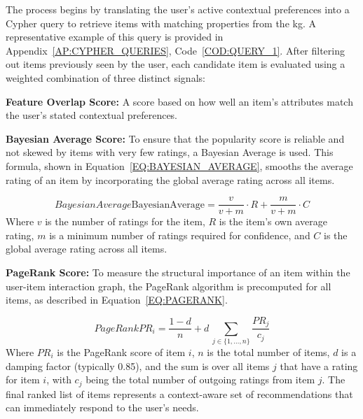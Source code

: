 The process begins by translating the user's active contextual preferences into a Cypher query to retrieve items with matching properties from the \ac{kg}. A representative example of this query is provided in Appendix~\ref{AP:CYPHER_QUERIES}, Code~\ref{COD:QUERY_1}. After filtering out items previously seen by the user, each candidate item is evaluated using a weighted combination of three distinct signals:
\begin{compactitem}[\textbullet]
    \item \textbf{Feature Overlap Score:} A score based on how well an item's attributes match the user's stated contextual preferences.
    \item \textbf{Bayesian Average Score:} To ensure that the popularity score is reliable and not skewed by items with very few ratings, a Bayesian Average is used. This formula, shown in Equation~\ref{EQ:BAYESIAN_AVERAGE}, smooths the average rating of an item by incorporating the global average rating across all items.
    
    \vspace{5pt}
    \begin{equation}[EQ:BAYESIAN_AVERAGE]{Bayesian Average}
        \text{BayesianAverage} = \frac{v}{v+m} \cdot R + \frac{m}{v+m} \cdot C
    \end{equation}
    Where $v$ is the number of ratings for the item, $R$ is the item's own average rating, $m$ is a minimum number of ratings required for confidence, and $C$ is the global average rating across all items.

    \item \textbf{PageRank Score:} To measure the structural importance of an item within the user-item interaction graph, the PageRank algorithm \cite{PAGERANK} is precomputed for all items, as described in Equation~\ref{EQ:PAGERANK}.

    \vspace{5pt}
    \begin{equation}[EQ:PAGERANK]{PageRank}
        PR_{i}={\frac  {1-d}{n}}+d\,\sum _{{j\in \{1,\dots ,n\}}}{\frac  {PR_{j}}{c_{j}}}
    \end{equation}
    Where $PR_i$ is the PageRank score of item $i$, $n$ is the total number of items, $d$ is a damping factor (typically 0.85), and the sum is over all items $j$ that have a rating for item $i$, with $c_j$ being the total number of outgoing ratings from item $j$. The final ranked list of items represents a context-aware set of recommendations that can immediately respond to the user's needs.
\end{compactitem}

